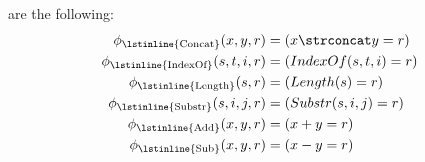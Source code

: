 are the following:
%
\begin{align*}
  \phi{}_{\text{\lstinline{Concat}}}(x, y, r)     &= (x \strconcat y   = r) \\
  \phi{}_{\text{\lstinline{IndexOf}}}(s, t, i, r) &= (IndexOf(s, t, i) = r) \\
  \phi{}_{\text{\lstinline{Length}}}(s, r)        &= (Length(s)        = r) \\
  \phi{}_{\text{\lstinline{Substr}}}(s, i, j, r)  &= (Substr(s, i, j)  = r) \\
  \phi{}_{\text{\lstinline{Add}}}(x, y, r)        &= (x + y            = r) \\
  \phi{}_{\text{\lstinline{Sub}}}(x, y, r)        &= (x - y            = r)
\end{align*}

